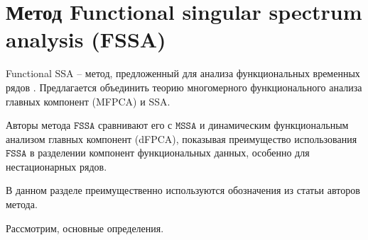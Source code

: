 \documentclass[12pt, specialist, subf
]{disser}
\theoremstyle{definition}
\newcommand{\MSSA}{\texttt{MSSA}}
\newcommand{\FSSA}{\texttt{FSSA}}
\begin{document}
\newpage








\chapter{Метод Functional singular spectrum analysis (FSSA)}
\label{sec:fssa}

Functional SSA -- метод, предложенный для анализа функциональных временных рядов \cite{haghbin2019functionalsingularspectrumanalysis}. Предлагается объединить теорию многомерного функционального анализа главных компонент (MFPCA) и SSA.

Авторы метода $\FSSA$ сравнивают его с $\MSSA$ и динамическим функциональным анализом главных компонент (dFPCA), показывая преимущество использования $\FSSA$ в разделении компонент функциональных данных, особенно для нестационарных рядов.

В данном разделе преимущественно используются обозначения из статьи \cite{haghbin2019functionalsingularspectrumanalysis} авторов метода.





Рассмотрим, основные определения.
\end{document}
